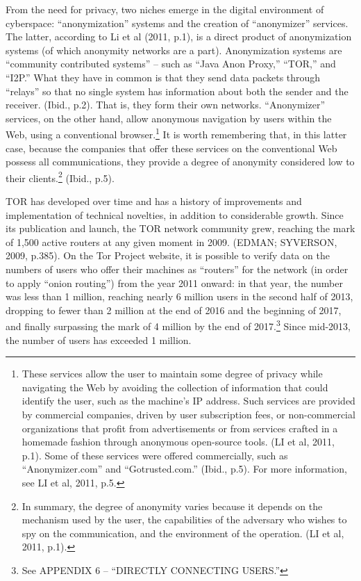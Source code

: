 From the need for privacy, two niches emerge in the digital environment of cyberspace: ``anonymization'' systems and the creation of ``anonymizer'' services. The latter, according to Li et al (2011, p.1), is a direct product of anonymization systems (of which anonymity networks are a part). Anonymization systems are ``community contributed systems'' -- such as ``Java Anon Proxy,'' ``TOR,'' and ``I2P.'' What they have in common is that they send data packets through ``relays'' so that no single system has information about both the sender and the receiver. (Ibid., p.2). That is, they form their own networks. ``Anonymizer'' services, on the other hand, allow anonymous navigation by users within the Web, using a conventional browser.\footnote{These services allow the user to maintain some degree of privacy while navigating the Web by avoiding the collection of information that could identify the user, such as the machine's IP address. Such services are provided by commercial companies, driven by user subscription fees, or non-commercial organizations that profit from advertisements or from services crafted in a homemade fashion through anonymous open-source tools. (LI et al, 2011, p.1). Some of these services were offered commercially, such as ``Anonymizer.com'' and ``Gotrusted.com.'' (Ibid., p.5). For more information, see LI et al, 2011, p.5.} It is worth remembering that, in this latter case, because the companies that offer these services on the conventional Web possess all communications, they provide a degree of anonymity considered low to their clients.\footnote{In summary, the degree of anonymity varies because it depends on the mechanism used by the user, the capabilities of the adversary who wishes to spy on the communication, and the environment of the operation. (LI et al, 2011, p.1).} (Ibid., p.5).

TOR has developed over time and has a history of improvements and implementation of technical novelties, in addition to considerable growth. Since its publication and launch, the TOR network community grew, reaching the mark of 1,500 active routers at any given moment in 2009. (EDMAN; SYVERSON, 2009, p.385). On the Tor Project website, it is possible to verify data on the numbers of users who offer their machines as ``routers'' for the network (in order to apply ``onion routing'') from the year 2011 onward: in that year, the number was less than 1 million, reaching nearly 6 million users in the second half of 2013, dropping to fewer than 2 million at the end of 2016 and the beginning of 2017, and finally surpassing the mark of 4 million by the end of 2017.\footnote{See APPENDIX 6 -- ``DIRECTLY CONNECTING USERS.''} Since mid-2013, the number of users has exceeded 1 million.

